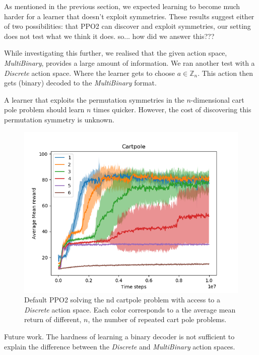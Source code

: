 As mentioned in the previous section, we expected learning to become much
harder for a learner that doesn't exploit symmetries. These results suggest either of two possibilities:
that PPO2 can discover and exploit symmetries, our setting does not test what we think it does. {\color{red}so... how did we answer this???}

While investigating this further, we realised that the given action space, \textit{MultiBinary}, provides a large amount of information. We ran another test with a \textit{Discrete} action space. Where the learner gets to choose $a\in \mathbb Z_n$.
This action then gets (binary) decoded to the \textit{MultiBinary} format.

A learner that exploits the permutation symmetries in the $n$-dimensional cart pole problem should learn $n$ times quicker.
However, the cost of discovering this permutation symmetry is unknown.

\begin{figure}[h!]
\centering
\includegraphics[width=1\textwidth,height=0.5\textheight]{../../pictures/figures/discrete-nd-cart.png}
\caption{Default PPO2 solving the nd cartpole problem with access to a \textit{Discrete} action space. Each color corresponds to a the average mean return of different, $n$, the number of repeated cart pole problems.}
\end{figure}






Future work. The hardness of learning a binary decoder is not sufficient to explain the difference between the
\textit{Discrete} and \textit{MultiBinary} action spaces.

